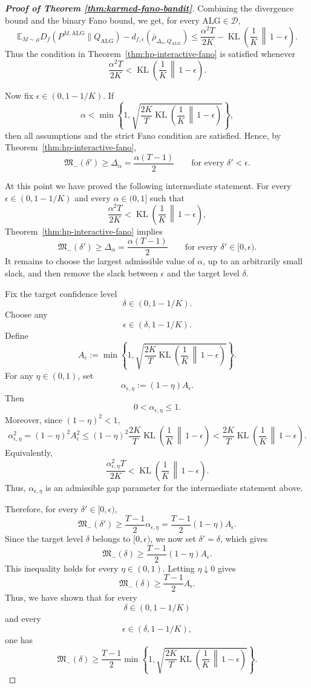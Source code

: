 \documentclass[journal]{IEEEtran}
\newcommand{\ALG}{\mathrm{ALG}}
\newcommand{\KL}{\operatorname{KL}}
\begin{document}
\begin{proof}[\textbf{Proof of Theorem \ref{thm:karmed-fano-bandit}}]
Combining the divergence bound and the binary Fano bound, we get, for every
\(\ALG\in\mathcal D\),
\[
\mathbb E_{M\sim\mu}
D_f(P^{M,\ALG}\|Q_\ALG)
-
d_{f,\epsilon}(\bar\rho_{\Delta_\alpha,Q_\ALG})
\le
\frac{\alpha^2T}{2K}
-
\KL\left(\frac1K\,\middle\|\,1-\epsilon\right).
\]
Thus the condition in Theorem~\ref{thm:hp-interactive-fano} is satisfied
whenever
\[
\frac{\alpha^2T}{2K}
<
\KL\left(\frac1K\,\middle\|\,1-\epsilon\right).
\]

Now fix \(\epsilon\in(0,1-1/K)\). If
\[
\alpha
<
\min\left\{
1,
\sqrt{
\frac{2K}{T}
\KL\left(\frac1K\,\middle\|\,1-\epsilon\right)
}
\right\},
\]
then all assumptions and the strict Fano condition are satisfied. Hence, by
Theorem~\ref{thm:hp-interactive-fano},
\[
\mathfrak M_-(\delta')\ge \Delta_\alpha
=
\frac{\alpha(T-1)}{2}
\qquad
\text{for every } \delta'<\epsilon.
\]

At this point we have proved the following intermediate statement. For every
\(\epsilon\in(0,1-1/K)\) and every \(\alpha\in(0,1]\) such that
\[
\frac{\alpha^2T}{2K}
<
\KL\left(\frac1K\,\middle\|\,1-\epsilon\right),
\]
Theorem~\ref{thm:hp-interactive-fano} implies
\[
\mathfrak M_-(\delta')\ge \Delta_\alpha
=
\frac{\alpha(T-1)}{2}
\qquad
\text{for every } \delta'\in[0,\epsilon).
\]
It remains to choose the largest admissible value of \(\alpha\), up to an
arbitrarily small slack, and then remove the slack between \(\epsilon\) and
the target level \(\delta\).

Fix the target confidence level
\[
\delta\in(0,1-1/K).
\]
Choose any
\[
\epsilon\in(\delta,1-1/K).
\]
Define
\[
A_\epsilon
:=
\min\left\{
1,
\sqrt{
\frac{2K}{T}
\KL\left(\frac1K\,\middle\|\,1-\epsilon\right)
}
\right\}.
\]
For any \(\eta\in(0,1)\), set
\[
\alpha_{\epsilon,\eta}:=(1-\eta)A_\epsilon.
\]
Then
\[
0<\alpha_{\epsilon,\eta}\le 1.
\]
Moreover, since \((1-\eta)^2<1\),
\[
\alpha_{\epsilon,\eta}^2
=
(1-\eta)^2 A_\epsilon^2
\le
(1-\eta)^2
\frac{2K}{T}
\KL\left(\frac1K\,\middle\|\,1-\epsilon\right)
<
\frac{2K}{T}
\KL\left(\frac1K\,\middle\|\,1-\epsilon\right).
\]
Equivalently,
\[
\frac{\alpha_{\epsilon,\eta}^2T}{2K}
<
\KL\left(\frac1K\,\middle\|\,1-\epsilon\right).
\]
Thus, \(\alpha_{\epsilon,\eta}\) is an admissible gap parameter for the
intermediate statement above.

Therefore, for every \(\delta'\in[0,\epsilon)\),
\[
\mathfrak M_-(\delta')
\ge
\frac{T-1}{2}\alpha_{\epsilon,\eta}
=
\frac{T-1}{2}(1-\eta)A_\epsilon.
\]
Since the target level \(\delta\) belongs to \([0,\epsilon)\), we now set
\(\delta'=\delta\), which gives
\[
\mathfrak M_-(\delta)
\ge
\frac{T-1}{2}(1-\eta)A_\epsilon.
\]
This inequality holds for every \(\eta\in(0,1)\). Letting
\(\eta\downarrow0\) gives
\[
\mathfrak M_-(\delta)
\ge
\frac{T-1}{2}A_\epsilon.
\]
Thus, we have shown that for every
\[
\delta\in(0,1-1/K)
\]
and every
\[
\epsilon\in(\delta,1-1/K),
\]
one has
\[
\mathfrak M_-(\delta)
\ge
\frac{T-1}{2}
\min\left\{
1,
\sqrt{
\frac{2K}{T}
\KL\left(\frac1K\,\middle\|\,1-\epsilon\right)
}
\right\}.
\]


\end{proof}
\end{document}
